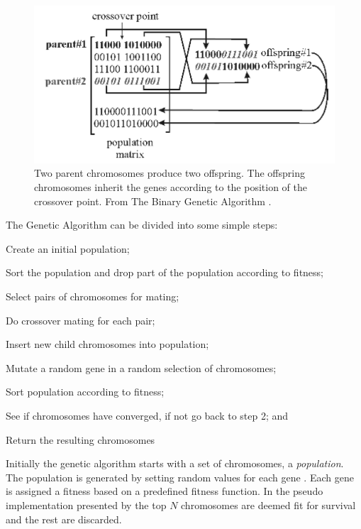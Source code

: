 \begin{figure}[!h]
  \begin{center}
    \includegraphics[totalheight=0.175\textheight]{figures/crossover}
  \end{center}
  \caption{Two parent chromosomes produce two offspring. The offspring chromosomes inherit the genes according to the position of the crossover point. From The Binary Genetic Algorithm \protect \cite[p. 42]{Haupt2004a}.}
  \label{fig:crossover}
\end{figure}

The Genetic Algorithm can be divided into some simple steps:
\begin{inparaenum}[\itshape 1\upshape)]
\item Create an initial population;
\item Sort the population and drop part of the population according to fitness;
\item Select pairs of chromosomes for mating;
\item Do crossover mating for each pair;
\item Insert new child chromosomes into population;
\item Mutate a random gene in a random selection of chromosomes;
\item Sort population according to fitness;
\item See if chromosomes have converged, if not go back to step 2; and
\item Return the resulting chromosomes
\end{inparaenum}

Initially the genetic algorithm starts with a set of chromosomes, a \textit{population}. The population is generated by setting random values for each gene \cite{Haupt2004a,Negnevitsky2002,Goldberg1989}. Each gene is assigned a fitness based on a predefined fitness function. In the pseudo implementation presented by \citeauthor{Haupt2004a} the top \(N\) chromosomes are deemed fit for survival and the rest are discarded.


